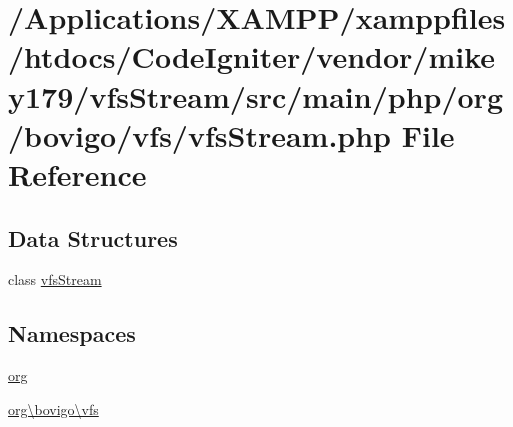 \hypertarget{vfs_stream_8php}{}\section{/\+Applications/\+X\+A\+M\+P\+P/xamppfiles/htdocs/\+Code\+Igniter/vendor/mikey179/vfs\+Stream/src/main/php/org/bovigo/vfs/vfs\+Stream.php File Reference}
\label{vfs_stream_8php}
\subsection*{Data Structures}
\begin{DoxyCompactItemize}
\item 
class \mbox{\hyperlink{classorg_1_1bovigo_1_1vfs_1_1vfs_stream}{vfs\+Stream}}
\end{DoxyCompactItemize}
\subsection*{Namespaces}
\begin{DoxyCompactItemize}
\item 
 \mbox{\hyperlink{namespaceorg}{org}}
\item 
 \mbox{\hyperlink{namespaceorg_1_1bovigo_1_1vfs}{org\textbackslash{}bovigo\textbackslash{}vfs}}
\end{DoxyCompactItemize}
